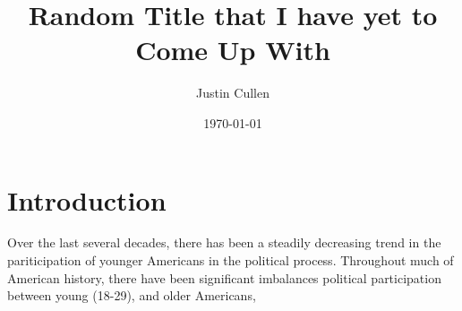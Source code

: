 \documentclass[12pt,letterpaper]{article}
\begin{document}
\title{Random Title that I have yet to Come Up With}
\author{Justin Cullen}
\date{\today}
\maketitle
\section{Introduction} %
\label{sec:Introduction}
Over the last several decades, there has been a steadily decreasing
trend in the pariticipation of younger Americans in the political
process.  Throughout much of American history, there have been
significant imbalances political participation between young (18-29),
and older Americans, 
\end{document}
